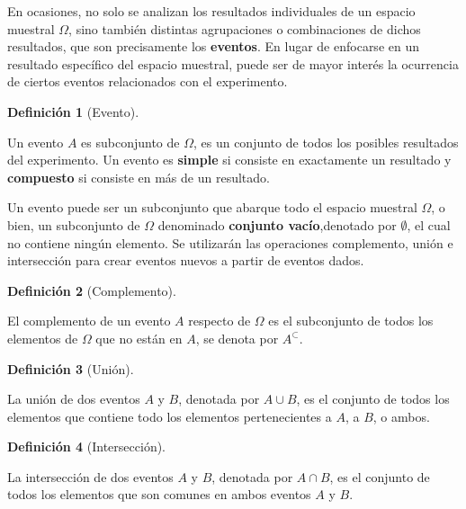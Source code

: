 \documentclass[
  us-letterpaper,
]{scrreprt}
\theoremstyle{plain}
\theoremstyle{definition}
\newtheorem{definition}{Definición}[chapter]
\theoremstyle{definition}
\theoremstyle{remark}
\begin{document}
En ocasiones, no solo se analizan los resultados individuales de un
espacio muestral \(\Omega\), sino también distintas agrupaciones o
combinaciones de dichos resultados, que son precisamente los
\textbf{eventos}. En lugar de enfocarse en un resultado específico del
espacio muestral, puede ser de mayor interés la ocurrencia de ciertos
eventos relacionados con el experimento.

\begin{definition}[Evento]\protect\hypertarget{def-EP}{}\label{def-EP}

Un evento \(A\) es subconjunto de \(\Omega\), es un conjunto de todos
los posibles resultados del experimento. Un evento es \textbf{simple} si
consiste en exactamente un resultado y \textbf{compuesto} si consiste en
más de un resultado.

\end{definition}

Un evento puede ser un subconjunto que abarque todo el espacio muestral
\(\Omega\), o bien, un subconjunto de \(\Omega\) denominado
\textbf{conjunto vacío},denotado por \(\emptyset\), el cual no contiene
ningún elemento. Se utilizarán las operaciones complemento, unión e
intersección para crear eventos nuevos a partir de eventos dados.

\begin{definition}[Complemento]\protect\hypertarget{def-complemento}{}\label{def-complemento}

El complemento de un evento \(A\) respecto de \(\Omega\) es el
subconjunto de todos los elementos de \(\Omega\) que no están en \(A\),
se denota por \(A^\subset\).

\end{definition}

\begin{definition}[Unión]\protect\hypertarget{def-union}{}\label{def-union}

La unión de dos eventos \(A\) y \(B\), denotada por \(A \cup B\), es el
conjunto de todos los elementos que contiene todo los elementos
pertenecientes a \(A\), a \(B\), o ambos.

\end{definition}

\begin{definition}[Intersección]\protect\hypertarget{def-intersec}{}\label{def-intersec}

La intersección de dos eventos \(A\) y \(B\), denotada por \(A \cap B\),
es el conjunto de todos los elementos que son comunes en ambos eventos
\(A\) y \(B\).

\end{definition}
\end{document}
